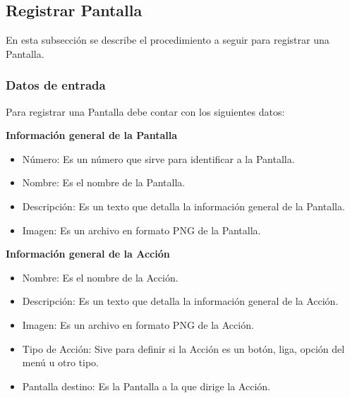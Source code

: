 \subsection{Registrar Pantalla}
En esta subsección se describe el procedimiento a seguir para registrar una Pantalla.

\subsubsection{Datos de entrada}
\begin{description}
	\item Para registrar una Pantalla debe contar con los siguientes datos: \hspace{10pt}
	\begin{description}
	    \item \textbf{Información general de la Pantalla}
	    \begin{itemize}
		  \item Número: Es un número que sirve para identificar a la Pantalla.
		  \item Nombre: Es el nombre de la Pantalla.
		  \item Descripción: Es un texto que detalla la información general de la Pantalla.
		  \item Imagen: Es un archivo en formato PNG de la Pantalla.
	    \end{itemize}
	    \item \textbf{Información general de la Acción}
	    \begin{itemize}
		  \item Nombre: Es el nombre de la Acción.
		  \item Descripción: Es un texto que detalla la información general de la Acción.
		  \item Imagen: Es un archivo en formato PNG de la Acción.
		  \item Tipo de Acción: Sive para definir si la Acción es un botón, liga, opción del menú u otro tipo.
		  \item Pantalla destino: Es la Pantalla a la que dirige la Acción.
	    \end{itemize}
	 \end{description}
\end{description}

